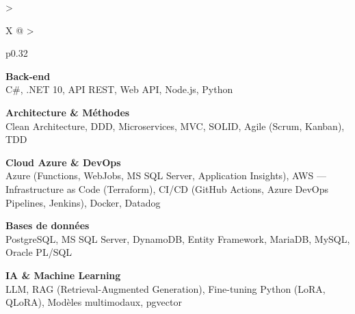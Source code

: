 \documentclass[10pt,a4paper]{article}
\begin{document}
\begin{tabularx}{\textwidth}{
  >{\raggedright\arraybackslash}X
  @{\hspace{1cm}}
  >{\raggedright\arraybackslash}p{0.32\textwidth}
}
\begin{minipage}[t]{\linewidth}
\textbf{\color{primary} Back-end}\\
\color{darkgray} C\#, .NET 10, API REST, Web API, Node.js, Python

\vspace{4pt}

\textbf{\color{primary} Architecture \& Méthodes}\\
\color{darkgray} Clean Architecture, DDD, Microservices, MVC, SOLID, Agile (Scrum, Kanban), TDD

\vspace{4pt}

\textbf{\color{primary} Cloud Azure \& DevOps}\\
\color{darkgray} Azure (Functions, WebJobs, MS SQL Server, Application Insights), AWS --- Infrastructure as Code (Terraform), CI/CD (GitHub Actions, Azure DevOps Pipelines, Jenkins), Docker, Datadog

\vspace{4pt}

\textbf{\color{primary} Bases de données}\\
\color{darkgray} PostgreSQL, MS SQL Server, DynamoDB, Entity Framework, MariaDB, MySQL, Oracle PL/SQL

\vspace{4pt}

\textbf{\color{primary} IA \& Machine Learning}\\
\color{darkgray} LLM, RAG (Retrieval-Augmented Generation), Fine-tuning Python (LoRA, QLoRA), Modèles multimodaux, pgvector

\vspace{4pt}

\end{minipage}
\\
\end{tabularx}
\end{document}
